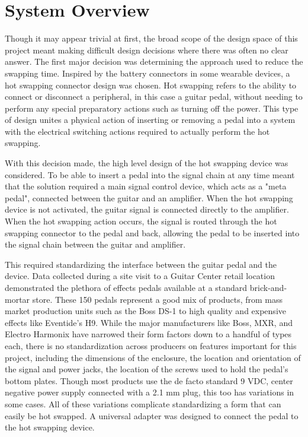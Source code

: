 \section{System Overview}

Though it may appear trivial at first, the broad scope of the design space of this project meant making difficult design decisions where there was often no clear answer.  The first major decision was determining the approach used to reduce the swapping time.  Inspired by the battery connectors in some wearable devices, a hot swapping connector design was chosen.  Hot swapping refers to the ability to connect or disconnect a peripheral, in this case a guitar pedal, without needing to perform any special preparatory actions such as turning off the power.  This type of design unites a physical action of inserting or removing a pedal into a system with the electrical switching actions required to actually perform the hot swapping.

With this decision made, the high level design of the hot swapping device was considered.  To be able to insert a pedal into the signal chain at any time meant that the solution required a main signal control device, which acts as a "meta pedal", connected between the guitar and an amplifier.  When the hot swapping device is not activated, the guitar signal is connected directly to the amplifier.  When the hot swapping action occurs, the signal is routed through the hot swapping connector to the pedal and back, allowing the pedal to be inserted into the signal chain between the guitar and amplifier.

This required standardizing the interface between the guitar pedal and the device.  Data collected during a site visit to a Guitar Center retail location demonstrated the plethora of effects pedals available at a standard brick-and-mortar store.  These 150 pedals represent a good mix of products, from mass market production units such as the Boss DS-1 to high quality and expensive effects like Eventide’s H9. While the major manufacturers like Boss, MXR, and Electro Harmonix have narrowed their form factors down to a handful of types each, there is no standardization across producers on features important for this project, including the dimensions of the enclosure, the location and orientation of the signal and power jacks, the location of the screws used to hold the pedal’s bottom plates. Though most products use the de facto standard 9 VDC, center negative power supply connected with a 2.1 mm plug, this too has variations in some cases. All of these variations complicate standardizing a form that can easily be hot swapped.  A universal adapter was designed to connect the pedal to the hot swapping device.

